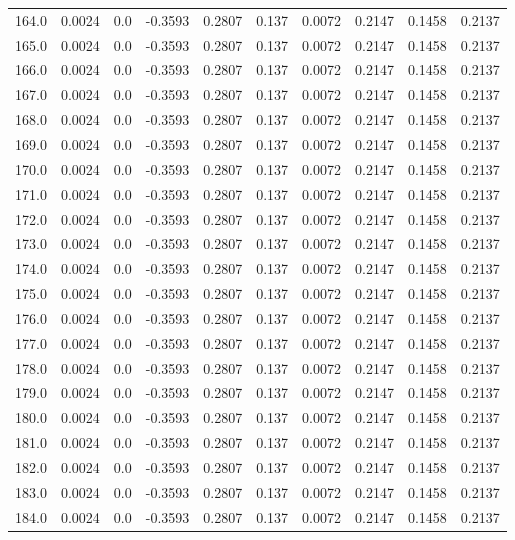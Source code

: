 \begin{longtable}{lrrrrrrrrr}
164.0 & 0.0024 & 0.0 & -0.3593 & 0.2807 & 0.137 & 0.0072 & 0.2147 & 0.1458 & 0.2137 \\
165.0 & 0.0024 & 0.0 & -0.3593 & 0.2807 & 0.137 & 0.0072 & 0.2147 & 0.1458 & 0.2137 \\
166.0 & 0.0024 & 0.0 & -0.3593 & 0.2807 & 0.137 & 0.0072 & 0.2147 & 0.1458 & 0.2137 \\
167.0 & 0.0024 & 0.0 & -0.3593 & 0.2807 & 0.137 & 0.0072 & 0.2147 & 0.1458 & 0.2137 \\
168.0 & 0.0024 & 0.0 & -0.3593 & 0.2807 & 0.137 & 0.0072 & 0.2147 & 0.1458 & 0.2137 \\
169.0 & 0.0024 & 0.0 & -0.3593 & 0.2807 & 0.137 & 0.0072 & 0.2147 & 0.1458 & 0.2137 \\
170.0 & 0.0024 & 0.0 & -0.3593 & 0.2807 & 0.137 & 0.0072 & 0.2147 & 0.1458 & 0.2137 \\
171.0 & 0.0024 & 0.0 & -0.3593 & 0.2807 & 0.137 & 0.0072 & 0.2147 & 0.1458 & 0.2137 \\
172.0 & 0.0024 & 0.0 & -0.3593 & 0.2807 & 0.137 & 0.0072 & 0.2147 & 0.1458 & 0.2137 \\
173.0 & 0.0024 & 0.0 & -0.3593 & 0.2807 & 0.137 & 0.0072 & 0.2147 & 0.1458 & 0.2137 \\
174.0 & 0.0024 & 0.0 & -0.3593 & 0.2807 & 0.137 & 0.0072 & 0.2147 & 0.1458 & 0.2137 \\
175.0 & 0.0024 & 0.0 & -0.3593 & 0.2807 & 0.137 & 0.0072 & 0.2147 & 0.1458 & 0.2137 \\
176.0 & 0.0024 & 0.0 & -0.3593 & 0.2807 & 0.137 & 0.0072 & 0.2147 & 0.1458 & 0.2137 \\
177.0 & 0.0024 & 0.0 & -0.3593 & 0.2807 & 0.137 & 0.0072 & 0.2147 & 0.1458 & 0.2137 \\
178.0 & 0.0024 & 0.0 & -0.3593 & 0.2807 & 0.137 & 0.0072 & 0.2147 & 0.1458 & 0.2137 \\
179.0 & 0.0024 & 0.0 & -0.3593 & 0.2807 & 0.137 & 0.0072 & 0.2147 & 0.1458 & 0.2137 \\
180.0 & 0.0024 & 0.0 & -0.3593 & 0.2807 & 0.137 & 0.0072 & 0.2147 & 0.1458 & 0.2137 \\
181.0 & 0.0024 & 0.0 & -0.3593 & 0.2807 & 0.137 & 0.0072 & 0.2147 & 0.1458 & 0.2137 \\
182.0 & 0.0024 & 0.0 & -0.3593 & 0.2807 & 0.137 & 0.0072 & 0.2147 & 0.1458 & 0.2137 \\
183.0 & 0.0024 & 0.0 & -0.3593 & 0.2807 & 0.137 & 0.0072 & 0.2147 & 0.1458 & 0.2137 \\
184.0 & 0.0024 & 0.0 & -0.3593 & 0.2807 & 0.137 & 0.0072 & 0.2147 & 0.1458 & 0.2137 \\

\end{longtable}
